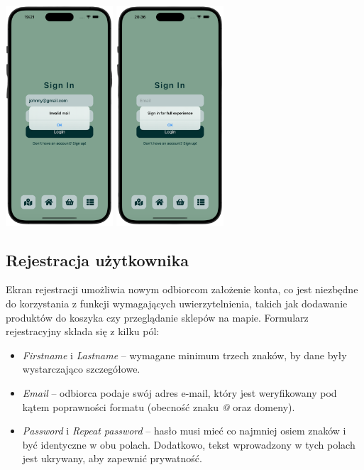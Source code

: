 \begin{center} 
    \includegraphics[width=0.3\textwidth]{images/front/login_invalid.png} 
    \includegraphics[width=0.3\textwidth]{images/front/login_not_signed.png} 
\end{center}

\subsection{Rejestracja użytkownika}

Ekran rejestracji umożliwia nowym odbiorcom założenie konta, co jest niezbędne do korzystania z funkcji wymagających uwierzytelnienia, takich jak dodawanie produktów do koszyka czy przeglądanie sklepów na mapie. Formularz rejestracyjny składa się z kilku pól:
\begin{itemize} \item \textit{Firstname} i \textit{Lastname} – wymagane minimum trzech znaków, by dane były wystarczająco szczegółowe. \item \textit{Email} – odbiorca podaje swój adres e-mail, który jest weryfikowany pod kątem poprawności formatu (obecność znaku \textit{@} oraz domeny). \item \textit{Password} i \textit{Repeat password} – hasło musi mieć co najmniej osiem znaków i być identyczne w obu polach. Dodatkowo, tekst wprowadzony w tych polach jest ukrywany, aby zapewnić prywatność. \end{itemize}

